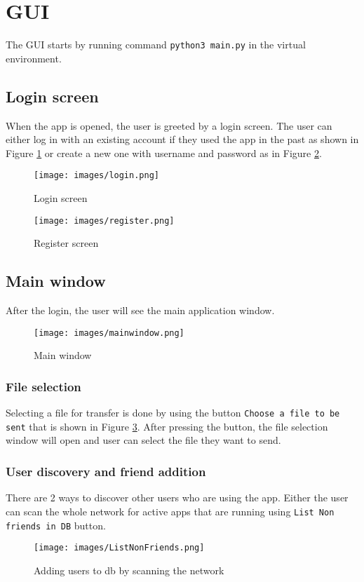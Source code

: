 \section{GUI}
The GUI starts by running command \texttt{python3 main.py} in the virtual environment.

\subsection{Login screen}
When the app is opened, the user is greeted by a login screen. The user can either log in with an existing account if they used the app in the past as shown in Figure \ref{fig:login} or create a new one with username and password as in Figure \ref{fig:reg}.
\begin{figure}[h]
    \centering
    \texttt{[image: images/login.png]}
    \caption{Login screen}
    \label{fig:login}
\end{figure}

\begin{figure}[h]
    \centering
    \texttt{[image: images/register.png]}
    \caption{Register screen}
    \label{fig:reg}
\end{figure}

\newpage

\subsection{Main window}
After the login, the user will see the main application window. 
\begin{figure}[h]
    \centering
    \texttt{[image: images/mainwindow.png]}
    \caption{Main window}
    \label{fig:main}
\end{figure}

\subsubsection{File selection}
Selecting a file for transfer is done by using the button \texttt{Choose a file to be sent} that is shown in Figure \ref{fig:main}. 
After pressing the button, the file selection window will open and user can select the file they want to send.

\subsubsection{User discovery and friend addition}
There are 2 ways to discover other users who are using the app. Either the user can scan the whole network for active apps that are running using \texttt{List Non friends in DB} button.
\begin{figure}[h]
    \centering
    \texttt{[image: images/ListNonFriends.png]}
    \caption{Adding users to db by scanning the network}
    \label{fig:LNF}
\end{figure}


